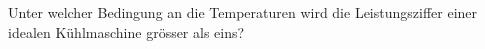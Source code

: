 Unter welcher Bedingung an die Temperaturen wird die Leistungsziffer einer idealen Kühlmaschine grösser als eins?
